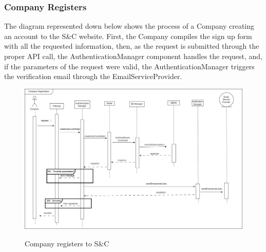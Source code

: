 \documentclass[a4paper,12pt]{article}
\begin{document}
\subsubsection*{Company Registers}
The diagram represented down below shows the process of a Company creating an account to the S\&C website. First, the Company compiles the sign up form with all the requested information, then, as the request is submitted through the proper API call, the AuthenticationManager component handles the request, and, if the parameters of the request were valid, the AuthenticationManager
triggers the verification email through the EmailServiceProvider.
\begin{figure}[H]
\centering
\includegraphics[scale = 0.42]{DD_figures/RuntimeView/CompanyRegistersRV.drawio.png}\\
\caption{Company registers to S\&C}
\end{figure}
\end{document}
